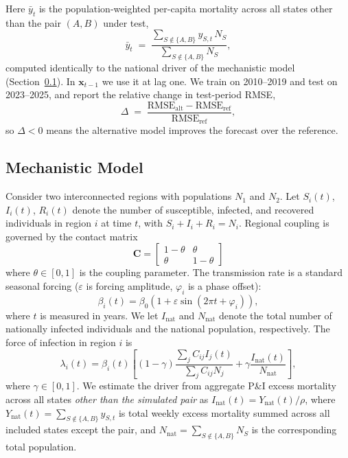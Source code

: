 \documentclass[11pt]{article}
\begin{document}
Here $\bar y_{t}$ is the population-weighted per-capita mortality
across all states other than the pair $(A, B)$ under test,
\begin{equation*}
\bar y_{t} \;=\; \frac{\sum_{S \notin \{A, B\}} y_{S, t}\, N_S}{\sum_{S \notin \{A, B\}} N_S},
\end{equation*}
computed identically to the national driver of the mechanistic model
(Section~\ref{subsec:model}). In $\mathbf{x}_{t-1}$ we use it at lag
one. We train on 2010--2019 and test on 2023--2025, and report the
relative change in test-period RMSE,
\begin{equation}\label{eq:sarima_delta}
  \Delta \;=\; \frac{\text{RMSE}_{\mathrm{alt}} - \text{RMSE}_{\mathrm{ref}}}{\text{RMSE}_{\mathrm{ref}}},
\end{equation}
so $\Delta < 0$ means the alternative model improves the forecast over
the reference.

\subsection{Mechanistic Model}\label{subsec:model}
Consider two interconnected regions with populations $N_1$ and $N_2$.
Let $S_i(t)$, $I_i(t)$, $R_i(t)$ denote the number of susceptible,
infected, and recovered individuals in region $i$ at time $t$, with
$S_i + I_i + R_i = N_i$. Regional coupling is governed by the contact
matrix
%
%
$$
\mathbf{C} =
\begin{bmatrix}
  1 - \theta  &     \theta \\
      \theta  & 1 - \theta
\end{bmatrix}
$$
%
%
where $\theta \in [0, 1]$ is the coupling parameter. The
transmission rate is a standard seasonal forcing ($\varepsilon$ is forcing
amplitude, $\varphi_i$ is a phase offset):
%
%
$$
\beta_i(t) = \beta_0(1 + \varepsilon\sin(2\pi t + \varphi_i)),
$$
%
%
where $t$ is measured in years. We let $I_{\text{nat}}$ and
$N_{\text{nat}}$ denote the total number of nationally infected
individuals and the national population, respectively. The
force of infection in region $i$ is~\citep{edlund2011}
\begin{equation}\label{eq:foi}
\lambda_i(t) = \beta_i(t)\left[(1-\gamma)\frac{\sum_j C_{ij} I_j(t)}{\sum_j C_{ij} N_j}
+ \gamma \frac{I_{\text{nat}}(t)}{N_{\text{nat}}}\right],
\end{equation}
where $\gamma \in [0, 1]$. We estimate the driver from aggregate P\&I
excess mortality across all states \emph{other than the simulated
pair} as $I_{\text{nat}}(t) = Y_{\text{nat}}(t)/\rho$, where
$Y_{\text{nat}}(t) = \sum_{S \notin \{A, B\}} y_{S,t}$ is total weekly
excess mortality summed across all included states except the pair,
and $N_{\text{nat}} = \sum_{S \notin \{A, B\}} N_S$ is the
corresponding total population.
\end{document}

